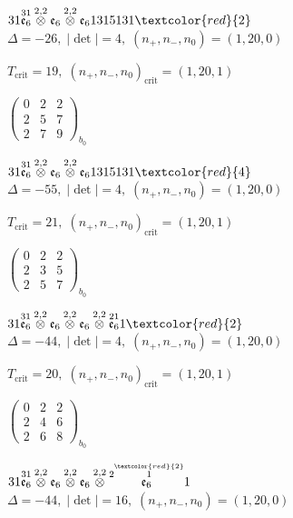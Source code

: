 \documentclass[10pt]{article}
\begin{document}
$31\overset{31}{\mathfrak{e}_6}\overset{2,2}{\otimes}\mathfrak{e}_6\overset{2,2}{\otimes}\mathfrak{e}_61315131\textcolor{red}{2}$ \quad $\Delta=-26,\; |\det|=4,\; (n_+,n_-,n_0)=(1,20,0)$

\hspace{1em}$T_{\text{crit}}=19,\; (n_+,n_-,n_0)_{\text{crit}}=(1,20,1)$

\hspace{2em}$\left(\begin{smallmatrix}0 & 2 & 2 \\ 2 & 5 & 7 \\ 2 & 7 & 9\end{smallmatrix}\right)_{\!b_0}$

$31\overset{31}{\mathfrak{e}_6}\overset{2,2}{\otimes}\mathfrak{e}_6\overset{2,2}{\otimes}\mathfrak{e}_61315131\textcolor{red}{4}$ \quad $\Delta=-55,\; |\det|=4,\; (n_+,n_-,n_0)=(1,20,0)$

\hspace{1em}$T_{\text{crit}}=21,\; (n_+,n_-,n_0)_{\text{crit}}=(1,20,1)$

\hspace{2em}$\left(\begin{smallmatrix}0 & 2 & 2 \\ 2 & 3 & 5 \\ 2 & 5 & 7\end{smallmatrix}\right)_{\!b_0}$

\smallskip

$31\overset{31}{\mathfrak{e}_6}\overset{2,2}{\otimes}\mathfrak{e}_6\overset{2,2}{\otimes}\mathfrak{e}_6\overset{2,2}{\otimes}\overset{21}{\mathfrak{e}_6}1\textcolor{red}{2}$ \quad $\Delta=-44,\; |\det|=4,\; (n_+,n_-,n_0)=(1,20,0)$

\hspace{1em}$T_{\text{crit}}=20,\; (n_+,n_-,n_0)_{\text{crit}}=(1,20,1)$

\hspace{2em}$\left(\begin{smallmatrix}0 & 2 & 2 \\ 2 & 4 & 6 \\ 2 & 6 & 8\end{smallmatrix}\right)_{\!b_0}$

$31\overset{31}{\mathfrak{e}_6}\overset{2,2}{\otimes}\mathfrak{e}_6\overset{2,2}{\otimes}\mathfrak{e}_6\overset{2,2}{\otimes}\overset{2\overset{\textcolor{red}{2}}{1}}{\mathfrak{e}_6}1$ \quad $\Delta=-44,\; |\det|=16,\; (n_+,n_-,n_0)=(1,20,0)$
\end{document}
